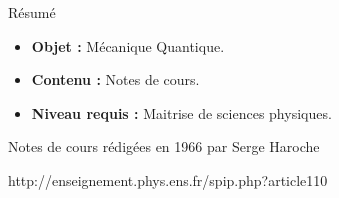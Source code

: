 \begin{center}
\Large
Résumé
\normalsize
\end{center}
\vspace{3cm}
\begin{itemize}[leftmargin=1cm, label=, itemsep=21pt]
\item {\bf Objet : } Mécanique Quantique.
\item {\bf Contenu : } Notes de cours.
\item {\bf Niveau requis : } Maitrise de sciences physiques.
\end{itemize}

\vspace{3cm} \large

Notes de cours rédigées en 1966 par Serge Haroche
\vspace{3cm}

http://enseignement.phys.ens.fr/spip.php?article110
\vspace{3cm}

